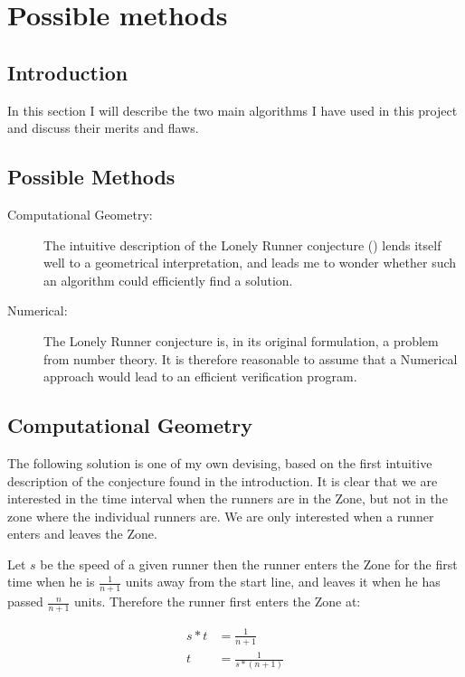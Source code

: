 \section{Possible methods}
\label{choiceOfMethod}

\subsection{Introduction}
In this section I will describe the two main algorithms I have used in this project and discuss their merits and flaws.\\

\subsection{Possible Methods}

\begin{description}
\item[Computational Geometry:] The intuitive description of the Lonely Runner conjecture () lends itself well to a geometrical interpretation, and leads me to wonder whether such an algorithm could efficiently find a solution.

\item[Numerical:] The Lonely Runner conjecture is, in its original formulation, a problem from number theory. It is therefore reasonable to assume that a Numerical approach would lead to an efficient verification program.
\end{description}

\subsection{Computational Geometry}
\label{compGeo}
The following solution is one of my own devising, based on the first intuitive description of the conjecture found in the introduction. It is clear that we are interested in the time interval when the runners are in the Zone, but not in the zone where the individual runners are. We are only interested when a runner enters and leaves the Zone. 

Let $s$ be the speed of a given runner then the runner enters the Zone for the first time when he is $\frac{1}{n+1}$ units away from the start line, and leaves it when he has passed $\frac{n}{n+1}$ units.
Therefore the runner first enters the Zone at: 

\begin{equation}
\label{eqa:speedOne}
\begin{split}
s * t &= \frac{1}{n+1} \\
t &= \frac{1}{s * (n+1)}
\end{split}
\end{equation}


